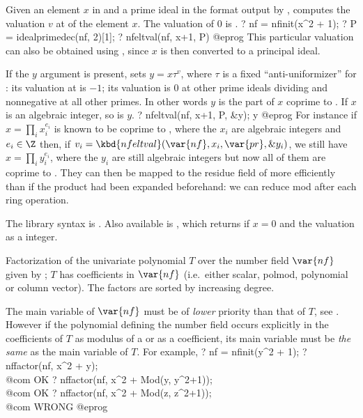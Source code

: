 \label{se:nfeltval}
Given an element $x$ in
 and a prime ideal  in the format output by
, computes the valuation $v$ at  of the
element $x$. The valuation of $0$ is .
\bprog
? nf = nfinit(x^2 + 1);
? P = idealprimedec(nf, 2)[1];
? nfeltval(nf, x+1, P)
@eprog\noindent
This particular valuation can also be obtained using
, since $x$ is then converted to a
principal ideal.

If the $y$ argument is present, sets $y = x \tau^v$, where $\tau$ is a
fixed ``anti-uniformizer'' for : its valuation at  is $-1$;
its valuation is $0$ at other prime ideals dividing  and
nonnegative at all other primes. In other words $y$ is the part of $x$
coprime to . If $x$ is an algebraic integer, so is $y$.
\bprog
? nfeltval(nf, x+1, P, &y); y
@eprog
For instance if $x = \prod_i x_i^{e_i}$ is known to be coprime to ,
where the $x_i$ are algebraic integers and $e_i\in\Z$ then,
if $v_i = \kbd{nfeltval}(\var{nf}, x_i, \var{pr}, \&y_i)$, we still
have $x = \prod_i y_i^{e_i}$, where the $y_i$ are still algebraic integers
but now all of them are coprime to . They can then be mapped to
the residue field of  more efficiently than if the product had
been expanded beforehand: we can reduce mod  after each ring
operation.

The library syntax is .
Also available is
, which returns
 if $x = 0$ and the valuation as a  integer.

\label{se:nffactor}
Factorization of the univariate
polynomial $T$ over the number field $\var{nf}$ given by ; $T$
has coefficients in $\var{nf}$ (i.e.~either scalar, polmod, polynomial or
column vector). The factors are sorted by increasing degree.

The main variable of $\var{nf}$ must be of \emph{lower}
priority than that of $T$, see . However if
the polynomial defining the number field occurs explicitly  in the
coefficients of $T$ as modulus of a  or as a 
coefficient, its main variable must be \emph{the same} as the main variable
of $T$. For example,
\bprog
? nf = nfinit(y^2 + 1);
? nffactor(nf, x^2 + y); \\@com OK
? nffactor(nf, x^2 + Mod(y, y^2+1)); \\ @com OK
? nffactor(nf, x^2 + Mod(z, z^2+1)); \\ @com WRONG
@eprog

